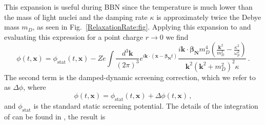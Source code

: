 This expansion is useful during BBN since the temperature is much lower than the mass of light nuclei and the damping rate $\kappa$ is approximately twice the Debye mass $m_D$, as seen in Fig.~\ref{RelaxationRate:fig}. Applying this expansion to  and evaluating this expression for a point charge $r \rightarrow 0$ we find
\begin{equation}\label{eq:ddsint}
\phi(t,\boldsymbol{x}) =\phi_{\text{stat}}(t,\boldsymbol{x})-Ze\int \frac{d^3\boldsymbol{k}}{(2\pi)^3} e^{ i\boldsymbol{k}\cdot(\boldsymbol{x}-\boldsymbol{\beta_{\text{N}}} t)}\frac{i \boldsymbol{k}\cdot \boldsymbol{\beta_{\text{N}}} m_D^4 (\frac{\boldsymbol{k}^2}{m_D^2} - \frac{\kappa^2}{\omega_p^2})}{\boldsymbol{k}^2(\boldsymbol{k}^2+m_D^2)^2\kappa}\,.
\end{equation}
The second term is the damped-dynamic screening correction, which we refer to as $\Delta \phi$, where
\begin{equation}\label{eq:pos_point}
\phi(t,\boldsymbol{x}) = \phi_{\text{stat}}(t,\boldsymbol{x}) +\Delta \phi(t,\boldsymbol{x}) \,,
\end{equation}
and $\phi_{\text{stat}}$ is the standard static screening potential. The details of the integration of  can be found in \cite{Grayson:2023flr}, the result is
